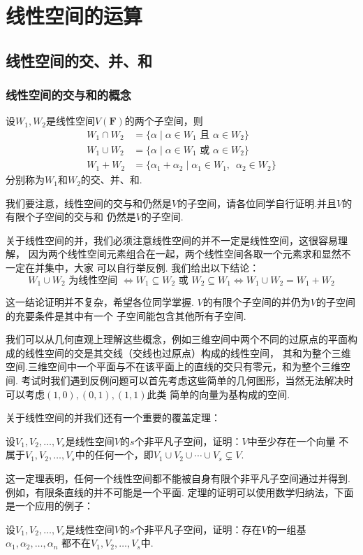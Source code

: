 \chapter{线性空间的运算}

\section{线性空间的交、并、和}
\subsection{线性空间的交与和的概念}
\begin{definition}
    设$W_1,W_2$是线性空间$V(\mathbf{F})$的两个子空间，则
    \begin{align*}
    W_1 \cap W_2&=\{\alpha \mid \alpha\in W_1 \text{ 且 } \alpha\in W_2\} \\
    W_1 \cup W_2&=\{\alpha \mid \alpha\in W_1 \text{ 或 } \alpha\in W_2\} \\
    W_1 + W_2&=\{\alpha_1+\alpha_2 \mid \alpha_1\in W_1,\enspace\alpha_2\in W_2\}
    \end{align*}
    分别称为$W_1$和$W_2$的交、并、和.
\end{definition}
我们要注意，线性空间的交与和仍然是$V$的子空间，请各位同学自行证明.并且$V$的有限个子空间的交与和
仍然是$V$的子空间.

关于线性空间的并，我们必须注意线性空间的并不一定是线性空间，这很容易理解，
因为两个线性空间元素组合在一起，两个线性空间各取一个元素求和显然不一定在并集中，大家
可以自行举反例. 我们给出以下结论：
\[ W_1 \cup W_2 \text{ 为线性空间 } \iff W_1 \subseteq W_2 \text{ 或 } W_2 \subseteq W_1 \iff W_1 \cup W_2=W_1+W_2 \]

这一结论证明并不复杂，希望各位同学掌握. $V$的有限个子空间的并仍为$V$的子空间的充要条件是其中有一个
子空间能包含其他所有子空间.

我们可以从几何直观上理解这些概念，例如三维空间中两个不同的过原点的平面构成的线性空间的交是其交线（交线也过原点）构成的线性空间，
其和为整个三维空间.三维空间中一个平面与不在该平面上的直线的交只有零元，和为整个三维空间.
考试时我们遇到反例问题可以首先考虑这些简单的几何图形，当然无法解决时可以考虑$(1,0),(0,1),(1,1)$此类
简单的向量为基构成的空间.

关于线性空间的并我们还有一个重要的覆盖定理：
\begin{theorem}
    设$V_1,V_2,\ldots,V_s$是线性空间$V$的$s$个非平凡子空间，证明：$V$中至少存在一个向量
    不属于$V_1,V_2,\ldots,V_s$中的任何一个，即$V_1 \cup V_2 \cup \cdots \cup V_s\subsetneq V.$
\end{theorem}
这一定理表明，任何一个线性空间都不能被自身有限个非平凡子空间通过并得到.例如，有限条直线的并不可能是一个平面.
定理的证明可以使用数学归纳法，下面是一个应用的例子：
\begin{example}
    设$V_1,V_2,\ldots,V_s$是线性空间$V$的$s$个非平凡子空间，证明：存在$V$的一组基$\alpha_1,\alpha_2,\ldots,\alpha_n$
    都不在$V_1,V_2,\ldots,V_s$中.
\end{example}

